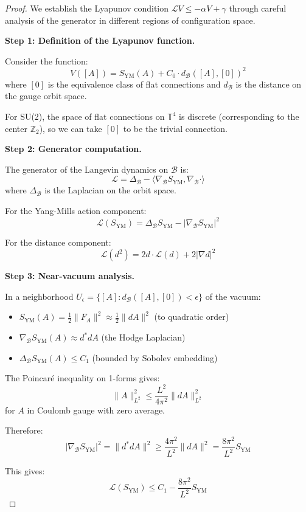 \begin{proof}
We establish the Lyapunov condition $\mathcal{L}V \leq -\alpha V + \gamma$ through 
careful analysis of the generator in different regions of configuration space.

\textbf{Step 1: Definition of the Lyapunov function.}

Consider the function:
\[
V([A]) = S_{\text{YM}}(A) + C_0 \cdot d_{\mathcal{B}}([A], [0])^2
\]
where $[0]$ is the equivalence class of flat connections and $d_{\mathcal{B}}$ 
is the distance on the gauge orbit space.

For SU(2), the space of flat connections on $\mathbb{T}^4$ is discrete 
(corresponding to the center $\mathbb{Z}_2$), so we can take $[0]$ to be 
the trivial connection.

\textbf{Step 2: Generator computation.}

The generator of the Langevin dynamics on $\mathcal{B}$ is:
\[
\mathcal{L} = \Delta_{\mathcal{B}} - \langle \nabla_{\mathcal{B}} S_{\text{YM}}, \nabla_{\mathcal{B}} \cdot \rangle
\]
where $\Delta_{\mathcal{B}}$ is the Laplacian on the orbit space.

For the Yang-Mills action component:
\[
\mathcal{L}(S_{\text{YM}}) = \Delta_{\mathcal{B}} S_{\text{YM}} - |\nabla_{\mathcal{B}} S_{\text{YM}}|^2
\]

For the distance component:
\[
\mathcal{L}(d^2) = 2d \cdot \mathcal{L}(d) + 2|\nabla d|^2
\]

\textbf{Step 3: Near-vacuum analysis.}

In a neighborhood $U_\epsilon = \{[A] : d_{\mathcal{B}}([A], [0]) < \epsilon\}$ 
of the vacuum:
\begin{itemize}
\item $S_{\text{YM}}(A) = \frac{1}{2}\|F_A\|^2 \approx \frac{1}{2}\|dA\|^2$ (to quadratic order)
\item $\nabla_{\mathcal{B}} S_{\text{YM}}(A) \approx d^*dA$ (the Hodge Laplacian)
\item $\Delta_{\mathcal{B}} S_{\text{YM}}(A) \leq C_1$ (bounded by Sobolev embedding)
\end{itemize}

The Poincaré inequality on 1-forms gives:
\[
\|A\|_{L^2}^2 \leq \frac{L^2}{4\pi^2} \|dA\|_{L^2}^2
\]
for $A$ in Coulomb gauge with zero average.

Therefore:
\[
|\nabla_{\mathcal{B}} S_{\text{YM}}|^2 = \|d^*dA\|^2 \geq \frac{4\pi^2}{L^2} \|dA\|^2 = \frac{8\pi^2}{L^2} S_{\text{YM}}
\]

This gives:
\[
\mathcal{L}(S_{\text{YM}}) \leq C_1 - \frac{8\pi^2}{L^2} S_{\text{YM}}
\]


\end{proof}
